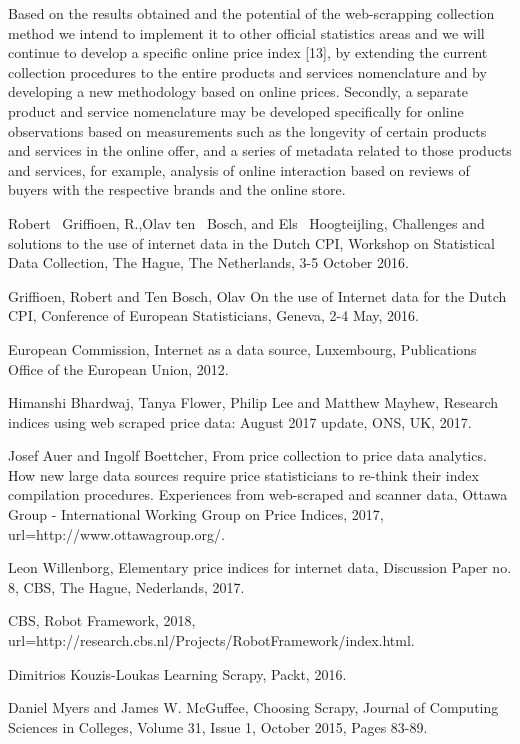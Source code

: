 \documentclass[]{article}
\begin{document}
Based on the results obtained and the potential of the web-scrapping collection method we intend to implement 
it to other official statistics areas and we will continue to develop a specific online price index [13], 
by extending the current collection procedures to the entire products and services nomenclature and by 
developing a new methodology based on online prices. Secondly, a separate product and service nomenclature may 
be developed specifically for online observations based on measurements such as the longevity of certain products 
and services in the online offer, and a series of metadata related to those products and services, for example, analysis of 
online interaction based on reviews of buyers with the respective brands and the online store.


\begin{thebibliography}{99}
Robert ~Griffioen, R.,Olav ten ~Bosch, and Els ~Hoogteijling, 
Challenges and solutions to the use of internet data in the Dutch CPI, 
Workshop on Statistical Data Collection, The Hague, The Netherlands, 3-5 October 2016.

Griffioen, Robert and Ten Bosch, Olav
On the use of Internet data for the Dutch CPI,
Conference of European Statisticians, Geneva, 2-4 May, 2016.

European Commission,
Internet as a data source,
Luxembourg, Publications Office of the European Union, 2012.


Himanshi Bhardwaj, Tanya Flower, Philip Lee and Matthew Mayhew,
Research indices using web scraped price data: August 2017 update, ONS, UK, 2017.


Josef Auer and Ingolf Boettcher, 
From price collection to price data analytics. How new large data sources require price statisticians to re-think their index compilation procedures. Experiences from web-scraped and scanner data,
Ottawa Group - International Working Group on Price Indices, 2017,
url={http://www.ottawagroup.org/}.

Leon Willenborg,
Elementary price indices for internet data,
Discussion Paper no. 8,
CBS, The Hague, Nederlands, 2017.


CBS,
Robot Framework, 
2018,
url={http://research.cbs.nl/Projects/RobotFramework/index.html}.


Dimitrios Kouzis-Loukas
Learning Scrapy, Packt, 2016.

Daniel Myers and James W. McGuffee,
Choosing Scrapy,
Journal of Computing Sciences in Colleges,
Volume 31, Issue 1, October 2015,
Pages 83-89.


\end{thebibliography}
\end{document}
